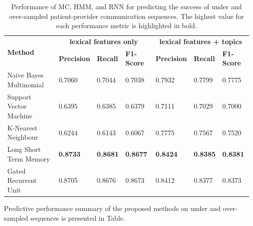 \documentclass{amia}
\begin{document}
\begin{table}[ht]
\centering
\caption{Performance of MC, HMM, and RNN for predicting the success of under and over-sampled patient-provider communication sequences. The highest value for each performance metric is highlighted in bold.}
\label{tab:result_under_over_sampled}
  \begin{tabular}{|l|l|l|l|l|l|l|}
  \hline
   \multirow{2}{*}{\textbf{Method}} & \multicolumn{3}{|c|}{\textbf{lexical features only}} & \multicolumn{3}{|c|}{\textbf{lexical features + topics}} \\\cline{2-7}
   & \textbf{Precision}  & \textbf{Recall} & \textbf{F1-Score} & \textbf{Precision}  & \textbf{Recall} & \textbf{F1-Score}\\ \hline    
    
 Naive Bayes Multinomial & 0.7060 & 0.7044 & 0.7038 & 0.7932 & 0.7799 & 0.7775 \\ \hline
 Support Vector Machine & 0.6395 & 0.6385 & 0.6379 & 0.7111 & 0.7029 & 0.7000\\ \hline
 K-Nearest Neighbour & 0.6244 & 0.6143 & 0.6067 & 0.7775 & 0.7567 & 0.7520\\ \hline
 Long Short Term Memory & \textbf{0.8733} & \textbf{0.8681} & \textbf{0.8677} & \textbf{0.8424} & \textbf{0.8385} & \textbf{0.8381}\\ \hline
 Gated Recurrent Unit & 0.8705 & 0.8676 & 0.8673 & 0.8412 & 0.8377 & 0.8373\\ \hline 
  \end{tabular}
\end{table} 

Predictive performance summary of the proposed methods on under and over-sampled sequences is presented in Table.\\
\end{document}
